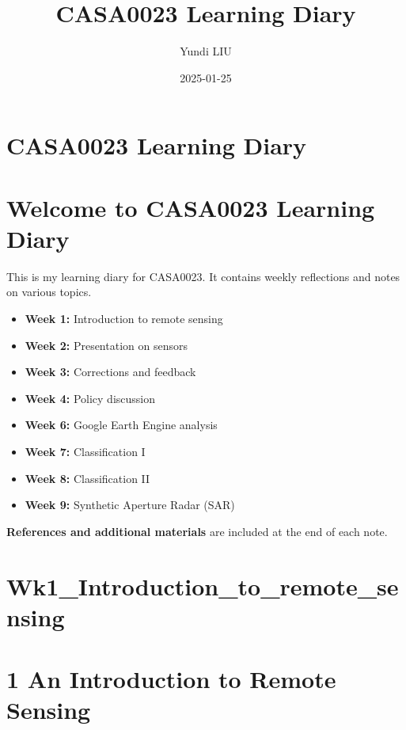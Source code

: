 \documentclass[
  letterpaper,
  DIV=11,
  numbers=noendperiod]{scrreprt}
\title{CASA0023 Learning Diary}
\author{Yundi LIU}
\date{2025-01-25}
\providecommand{\tightlist}{%
  \setlength{\itemsep}{0pt}\setlength{\parskip}{0pt}}\usepackage{longtable,booktabs,array}
\renewcommand*\contentsname{Table of contents}
\newcommand\contentsname{Table of contents}
\begin{document}
\maketitle

\renewcommand*\contentsname{Table of contents}
{
\hypersetup{linkcolor=}
\setcounter{tocdepth}{2}
\tableofcontents
}

\chapter{CASA0023 Learning Diary}\label{casa0023-learning-diary}


\chapter{Welcome to CASA0023 Learning
Diary}\label{welcome-to-casa0023-learning-diary}

This is my learning diary for CASA0023. It contains weekly reflections
and notes on various topics.

\begin{itemize}
\tightlist
\item
  \textbf{Week 1:} Introduction to remote sensing
\item
  \textbf{Week 2:} Presentation on sensors
\item
  \textbf{Week 3:} Corrections and feedback
\item
  \textbf{Week 4:} Policy discussion
\item
  \textbf{Week 6:} Google Earth Engine analysis
\item
  \textbf{Week 7:} Classification I
\item
  \textbf{Week 8:} Classification II
\item
  \textbf{Week 9:} Synthetic Aperture Radar (SAR)
\end{itemize}

\textbf{References and additional materials} are included at the end of
each note.


\chapter{Wk1\_Introduction\_to\_remote\_sensing}\label{wk1_introduction_to_remote_sensing}


\chapter{1 An Introduction to Remote
Sensing}\label{an-introduction-to-remote-sensing}
\end{document}
